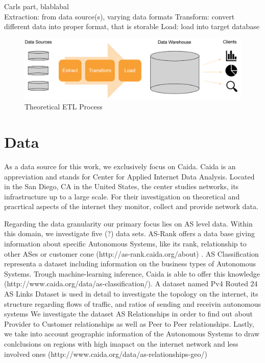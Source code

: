 \documentclass[conference]{IEEEtran}
\begin{document}
Carls part, blablabal \\ 

Extraction: from data source(s), varying data formats
Transform: convert different data into proper format, that is storable
Load: load into target database




\begin{figure}[htbp]
\centerline{\includegraphics[scale=0.3]{Graphics/ETLTheory.PNG}}
\caption{Theoretical ETL Process}
\label{fig}
\end{figure}

\section{Data}
As a data source for this work, we exclusively focus on Caida. Caida is an appreviation and stands for Center for Applied Internet Data Analysis. Located in the San Diego, CA in the United States, the center studies networks, its infrastructure up to a large scale. For their investigation on theoretical and pracrtical aspects of the internet they monitor, collect and provide network data. 

Regarding the data granularity our primary focus lies on AS level data. Within this domain, we investigate five (?) data sets. AS-Rank offers a data base giving information about specific Autonomous Systems, like its rank, relationship to other ASes or customer cone (http://as-rank.caida.org/about) . AS Classification representa a dataset including information on the business types of Autonomous Systems. Trough machine-learning inference, Caida is able to offer this knowledge (http://www.caida.org/data/as-classification/). A dataset named Pv4 Routed 24 AS Links Dataset is used in detail to investigate the topology on the internet, its structure regarding flows of traffic, and ratios of sending and receivin autonomous systems %
We investigate the dataset AS Relationships in order to find out about Provider to Customer relationships as well as Peer to Peer relationships.  Lastly, we take into account geographic information of the Autonomous Systems to draw conlclusions on regions with high imapact on the internet network and less involved ones (http://www.caida.org/data/as-relationships-geo/)
\end{document}
